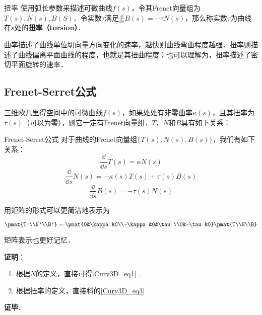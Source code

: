 \begin{definition}{扭率}
使用弧长参数来描述可微曲线$f(s)$，令其Frenet向量组为$T(s), N(s), B(S)$．令实数$\tau$满足$\frac{\dd}{\dd s}B(s)=-\tau N(s)$，那么称实数$\tau$为曲线在$s$处的\textbf{扭率（torsion）}．
\end{definition}

曲率描述了曲线单位切向量方向变化的速率，越快则曲线弯曲程度越强．扭率则描述了曲线偏离平面曲线的程度，也就是其扭曲程度；也可以理解为，扭率描述了密切平面旋转的速率．

\subsection{Frenet-Serret公式}

三维欧几里得空间中的可微曲线$f(s)$，如果处处有非零曲率$\kappa(s)$，且其扭率为$\tau(s)$（可以为零），则它一定有Frenet向量组．$T$，$N$和$B$具有如下关系：

\begin{theorem}{Frenet-Serret公式}
对于曲线的Frenet向量组$\{T(s), N(s), B(s)\}$，我们有如下关系：
\begin{equation}\label{Curv3D_eq1}
\frac{\dd}{\dd s}T(s)=\kappa N(s)
\end{equation}
\begin{equation}\label{Curv3D_eq2}
\frac{\dd}{\dd s}N(s)=-\kappa(s) T(s)+\tau(s) B(s)
\end{equation}
\begin{equation}\label{Curv3D_eq3}
\frac{\dd}{\dd s}B(s)=-\tau(s) N(s)
\end{equation}

用矩阵的形式可以更简洁地表示为

\begin{equation}
\pmat{T'\\N'\\B'}=\pmat{0&\kappa&0\\-\kappa&0&\tau\\0&-\tau&0}\pmat{T\\N\\B}
\end{equation}

矩阵表示也更好记忆．
\end{theorem}

\textbf{证明}：

\begin{enumerate}
\item 根据$N$的定义，直接可得\autoref{Curv3D_eq1} .
\item 根据扭率的定义，直接科的\autoref{Curv3D_eq3} 
\end{enumerate}

\textbf{证毕}．





